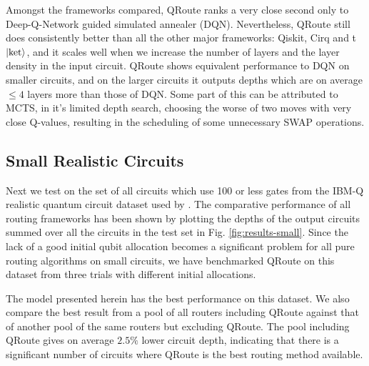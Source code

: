 \documentclass[%
 reprint,
amsmath,amssymb,showkeys,
pra,
]{revtex4-2}
\begin{document}
Amongst the frameworks compared, QRoute ranks a very close second only to Deep-Q-Network guided simulated annealer (DQN). Nevertheless, QRoute still does consistently better than all the other major frameworks: Qiskit, Cirq and t$\ket{\text{ket}}$, and it scales well when we increase the number of layers and the layer density in the input circuit. QRoute shows equivalent performance to DQN on smaller circuits, and on the larger circuits it outputs depths which are on average $\leq 4$ layers more than those of DQN. Some part of this can be attributed to MCTS, in it's limited depth search, choosing the worse of two moves with very close Q-values, resulting in the scheduling of some unnecessary SWAP operations.

\subsection{\label{sec:results-small}Small Realistic Circuits}

Next we test on the set of all circuits which use 100 or less gates from the IBM-Q realistic quantum circuit dataset used by \citet{data_realistic}. The comparative performance of all routing frameworks has been shown by plotting the depths of the output circuits summed over all the circuits in the test set in Fig. \ref{fig:results-small}. Since the lack of a good initial qubit allocation becomes a significant problem for all pure routing algorithms on small circuits, we have benchmarked QRoute on this dataset from three trials with different initial allocations.

The model presented herein has the best performance on this dataset. We also compare the best result from a pool of all routers including QRoute against that of another pool of the same routers but excluding QRoute. The pool including QRoute gives on average $2.5\%$ lower circuit depth, indicating that there is a significant number of circuits where QRoute is the best routing method available.
\end{document}
